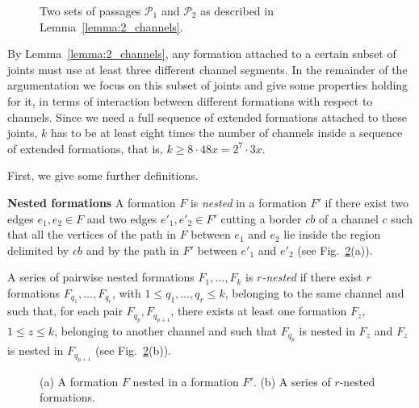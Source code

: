 \documentclass[a4paper,10pt]{llncs}
\newcounter{prop}
\begin{document}
\begin{figure}[tb]
\caption{Two sets of passages ${\mathcal P}_1$ and ${\mathcal P}_2$ as described in Lemma~\ref{lemma:2_channels}.}
  \label{fig:lemma5}
\end{figure}

By Lemma~\ref{lemma:2_channels}, any formation attached to a certain subset of joints must use at least three different channel segments. In the remainder of the argumentation we focus on this subset of joints and give some properties holding for it, in terms of interaction between different formations with respect to channels. Since we need a full sequence of extended formations attached to these joints, $k$ has to be at least eight times the number of channels inside a sequence of extended formations, that is, $k \geq 8 \cdot 48x=2^7\cdot 3 x$.

First, we give some further definitions.

{\bf Nested formations}
A formation $F$ is {\it nested} in a formation $F'$ if there exist two edges $e_1,e_2 \in F$ and two edges $e'_1,e'_2 \in F'$ cutting a border $cb$ of a channel $c$ such that all the vertices of the path in $F$ between $e_1$ and $e_2$ lie inside the region delimited by $cb$ and by the path in $F'$ between $e'_1$ and $e'_2$ (see Fig.~\ref{fig:nested_formations}(a)).

A series of pairwise nested formations $F_1, \ldots, F_k$ is {\it $r$-nested} if there exist $r$ formations $F_{q_1}, \ldots, F_{q_r}$, with $1\leq q_1,\ldots,q_r \leq k$, belonging to the same channel and such that, for each pair $F_{q_p},F_{q_{p+1}}$, there exists at least one formation $F_z$, $1 \leq z \leq k$, belonging to another channel and such that $F_{q_p}$ is nested in $F_z$ and $F_z$ is nested in $F_{q_{p+1}}$ (see Fig.~\ref{fig:nested_formations}(b)).

\begin{figure}[htb]
\caption{(a) A formation $F$ nested in a formation $F'$. (b) A series of $r$-nested formations.}
  \label{fig:nested_formations}
\end{figure}
\end{document}
